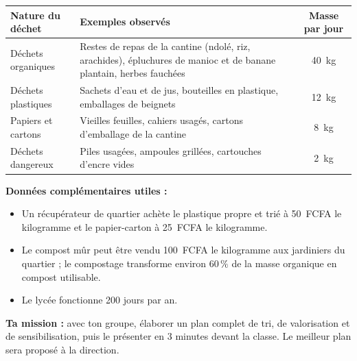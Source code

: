 \documentclass[11pt]{article}
\newcounter{popsec}
\newcounter{popsub}
\newcommand{\courssub}[1]{%
  \stepcounter{popsub}%
  \par\vspace{9pt}\noindent{\popxbold\fontsize{11.5}{13}\selectfont\color{popink}{\color{poporange}\thepopsec.\thepopsub}\hspace{6pt}#1}\par\nopagebreak\vspace{4pt}
}
\begin{document}
\begin{center}
\begin{tabularx}{\linewidth}{|l|X|c|}
\hline
\rowcolor{popblueL}
\textbf{Nature du déchet} & \textbf{Exemples observés} & \textbf{Masse par jour} \\
\hline
Déchets organiques & Restes de repas de la cantine (ndolé, riz, arachides), épluchures de manioc et de banane plantain, herbes fauchées & \SI{40}{kg} \\
\hline
Déchets plastiques & Sachets d'eau et de jus, bouteilles en plastique, emballages de beignets & \SI{12}{kg} \\
\hline
Papiers et cartons & Vieilles feuilles, cahiers usagés, cartons d'emballage de la cantine & \SI{8}{kg} \\
\hline
Déchets dangereux & Piles usagées, ampoules grillées, cartouches d'encre vides & \SI{2}{kg} \\
\hline
\end{tabularx}
\end{center}

\textbf{Données complémentaires utiles :}
\begin{itemize}
\item Un récupérateur de quartier achète le plastique propre et trié à \SI{50}{FCFA} le kilogramme et le papier-carton à \SI{25}{FCFA} le kilogramme.
\item Le compost mûr peut être vendu \SI{100}{FCFA} le kilogramme aux jardiniers du quartier ; le compostage transforme environ $60\,\%$ de la masse organique en compost utilisable.
\item Le lycée fonctionne \num{200} jours par an.
\end{itemize}

\textbf{Ta mission :} avec ton groupe, élaborer un plan complet de tri, de valorisation et de sensibilisation, puis le présenter en 3 minutes devant la classe. Le meilleur plan sera proposé à la direction.

\courssub{Consignes}
\end{document}
